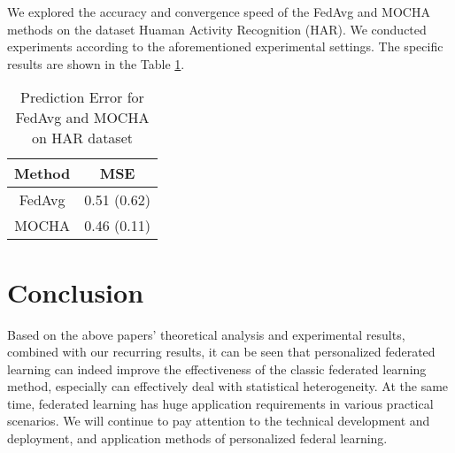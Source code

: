 \documentclass[a4paper,12pt,authoryear]{elegantpaper}
\begin{document}
We explored the accuracy and convergence speed of the FedAvg and MOCHA methods on the dataset Huaman Activity Recognition (HAR). We conducted experiments according to the aforementioned experimental settings. The specific results are shown in the Table \ref{table:prediction-error}.

\begin{table}[hpt]
    \centering
    \caption{Prediction Error for FedAvg and MOCHA on HAR dataset}
    \label{table:prediction-error}
    \begin{tabular}{cc}
        \toprule
        Method & MSE         \\
        \midrule
        FedAvg & 0.51 (0.62) \\
        MOCHA  & 0.46 (0.11) \\
        \bottomrule
    \end{tabular}
\end{table}

\section{Conclusion}

Based on the above papers' theoretical analysis and experimental results, combined with our recurring results, it can be seen that personalized federated learning can indeed improve the effectiveness of the classic federated learning method, especially can effectively deal with statistical heterogeneity. At the same time, federated learning has huge application requirements in various practical scenarios. We will continue to pay attention to the technical development and deployment, and application methods of personalized federal learning.

\clearpage

\end{document}
